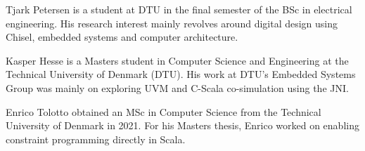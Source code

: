 \documentclass[conference]{IEEEtran}
\begin{document}
\begin{IEEEbiography}{Tjark Petersen}
  is a student at DTU in the final semester of the BSc in electrical engineering. 
  His research interest mainly revolves around digital design using Chisel, embedded systems and computer architecture.
\end{IEEEbiography}

\begin{IEEEbiography}{Kasper Hesse}
  is a Masters student in Computer Science and Engineering at the Technical University of Denmark (DTU).
  His work at DTU's Embedded Systems Group was mainly on exploring UVM and C-Scala co-simulation using the JNI.
\end{IEEEbiography}

\begin{IEEEbiography}{Enrico Tolotto}
  obtained an MSc in Computer Science from the Technical University of Denmark in 2021.
  For his Masters thesis, Enrico worked on enabling constraint programming directly in Scala.
\end{IEEEbiography}
\end{document}
